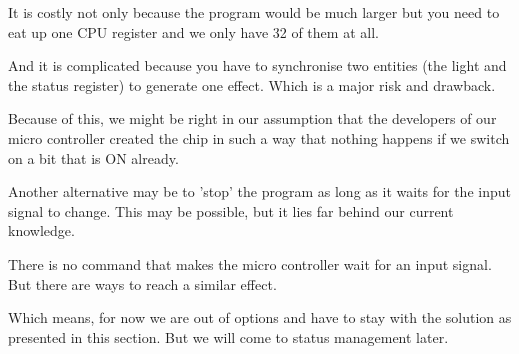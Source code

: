 It is costly not only because the program would be much larger but you need to eat up one CPU register and we only have 32 of them at all.

And it is complicated because you have to synchronise two entities (the light and the status register) to generate one effect. Which is a major risk and drawback.

Because of this, we might be right in our assumption that the developers of our \at micro controller created the chip in such a way that nothing happens if we switch on a bit that is ON already.

Another alternative may be to 'stop' the program as long as it waits for the input signal to change. This may be possible, but it lies far behind our current knowledge.

There is no command that makes the micro controller wait for an input signal. But there are ways to reach a similar effect.

Which means, for now we are out of options and have to stay with the solution as presented in this section. But we will come to status management later.